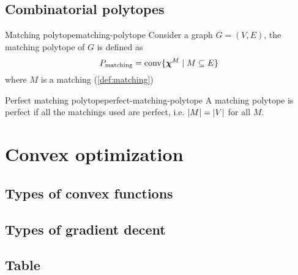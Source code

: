 \documentclass[12pt]{extarticle}
\renewcommand{\vec}[1]{\bvec{#1}}
\numberwithin{equation}{subsection}
\begin{document}
\subsection{Combinatorial polytopes}

\begin{definition}{Matching polytope}{matching-polytope}
	Consider a graph $G = (V, E)$, the matching polytope of $G$ is defined as
	\begin{equation}
		P_\text{matching} = \conv\{ \vec \chi^M \mid M \subseteq E\}
	\end{equation}
	where $M$ is a matching (\cref{def:matching})
\end{definition}

\begin{definition}{Perfect matching polytope}{perfect-matching-polytope}
	A matching polytope is perfect if all the matchings used are perfect, i.e. $\abs{M} = \abs{V}$ for
	all $M$.
\end{definition}

\section{Convex optimization}

\subsection{Types of convex functions}

\subsection{Types of gradient decent}

\subsection{Table}
\end{document}
